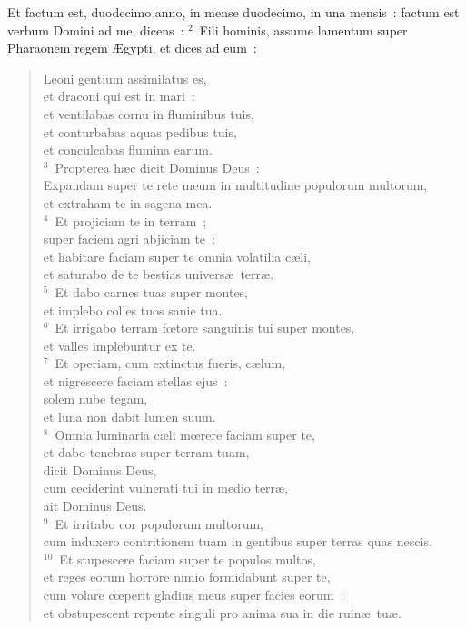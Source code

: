\bchapter
\lettrine[lines=3,image=true,loversize=0.05,lraise=-0.03]{E}{}t factum est, duodecimo anno, in mense duodecimo, in una mensis~: factum est verbum Domini ad me, dicens~:
${}^{2}$~Fili hominis, assume lamentum super Pharaonem regem \AE gypti, et dices ad eum~: \begin{flushleft}\begin{verse}Leoni gentium assimilatus es,\\ et draconi qui est in mari~:\\ et ventilabas cornu in fluminibus tuis,\\ et conturbabas aquas pedibus tuis,\\ et conculcabas flumina earum.\\
${}^{3}$~Propterea h\ae c dicit Dominus Deus~:\\ Expandam super te rete meum in multitudine populorum multorum,\\ et extraham te in sagena mea.\\
${}^{4}$~Et projiciam te in terram~;\\ super faciem agri abjiciam te~:\\ et habitare faciam super te omnia volatilia c\ae li,\\ et saturabo de te bestias univers\ae\ terr\ae .\\
${}^{5}$~Et dabo carnes tuas super montes,\\ et implebo colles tuos sanie tua.\\
${}^{6}$~Et irrigabo terram fœtore sanguinis tui super montes,\\ et valles implebuntur ex te.\\
${}^{7}$~Et operiam, cum extinctus fueris, c\ae lum,\\ et nigrescere faciam stellas ejus~:\\ solem nube tegam,\\ et luna non dabit lumen suum.\\
${}^{8}$~Omnia luminaria c\ae li mœrere faciam super te,\\ et dabo tenebras super terram tuam,\\ dicit Dominus Deus,\\ cum ceciderint vulnerati tui in medio terr\ae ,\\ ait Dominus Deus.\\
${}^{9}$~Et irritabo cor populorum multorum,\\ cum induxero contritionem tuam in gentibus super terras quas nescis.\\
${}^{10}$~Et stupescere faciam super te populos multos,\\ et reges eorum horrore nimio formidabunt super te,\\ cum volare cœperit gladius meus super facies eorum~:\\ et obstupescent repente singuli pro anima sua in die ruin\ae\ tu\ae .\\

\end{verse}
\end{flushleft}
